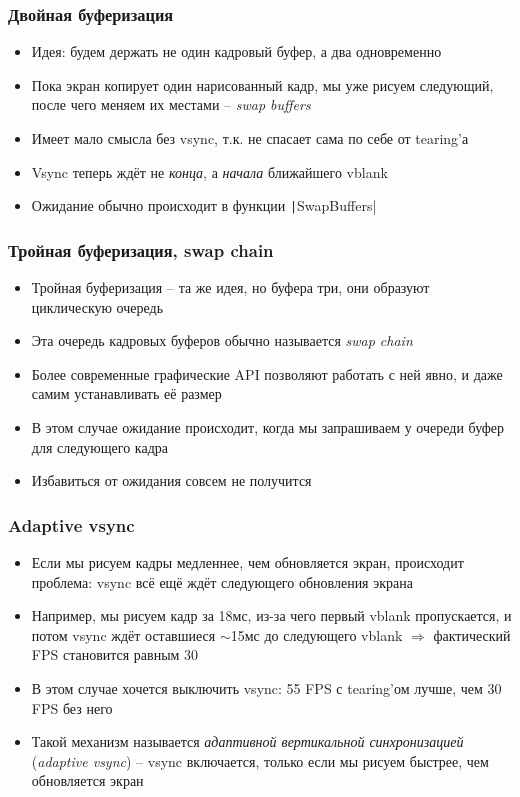 \documentclass{beamer}
\begin{document}
\begin{frame}[fragile]
\frametitle{Двойная буферизация}
\begin{itemize}
\item Идея: будем держать не один кадровый буфер, а два одновременно
\pause
\item Пока экран копирует один нарисованный кадр, мы уже рисуем следующий, после чего меняем их местами -- \textit{swap buffers}
\pause
\item Имеет мало смысла без vsync, т.к. не спасает сама по себе от tearing'а
\pause
\item Vsync теперь ждёт не \textit{конца}, а \textit{начала} ближайшего vblank
\pause
\item Ожидание обычно происходит в функции \texttt|SwapBuffers|
\end{itemize}
\end{frame}

\begin{frame}[fragile]
\frametitle{Тройная буферизация, swap chain}
\begin{itemize}
\item Тройная буферизация -- та же идея, но буфера три, они образуют циклическую очередь
\pause
\item Эта очередь кадровых буферов обычно называется \textit{swap chain}
\pause
\item Более современные графические API позволяют работать с ней явно, и даже самим устанавливать её размер
\pause
\item В этом случае ожидание происходит, когда мы запрашиваем у очереди буфер для следующего кадра
\pause
\item Избавиться от ожидания совсем не получится
\end{itemize}
\end{frame}

\begin{frame}[fragile]
\frametitle{Adaptive vsync}
\begin{itemize}
\item Если мы рисуем кадры медленнее, чем обновляется экран, происходит проблема: vsync всё ещё ждёт следующего обновления экрана
\pause
\item Например, мы рисуем кадр за 18мс, из-за чего первый vblank пропускается, и потом vsync ждёт оставшиеся $\sim$15мс до следующего vblank $\Longrightarrow$ фактический FPS становится равным 30
\pause
\item В этом случае хочется выключить vsync: 55 FPS с tearing'ом лучше, чем 30 FPS без него
\pause
\item Такой механизм называется \textit{адаптивной вертикальной синхронизацией} (\textit{adaptive vsync}) -- vsync включается, только если мы рисуем быстрее, чем обновляется экран
\end{itemize}
\end{frame}
\end{document}
